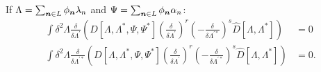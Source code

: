 \begin{lemma}
\label{lmm:formalism:func-wigner:zero-integrals}
If $\Lambda = \sum_{\boldsymbol{n} \in L} \phi_{\boldsymbol{n}} \lambda_n$ and $\Psi = \sum_{\boldsymbol{n} \in L} \phi_{\boldsymbol{n}} \alpha_n$:
\begin{equation*}
\begin{split}
	\int \delta^2\Lambda
		\frac{\delta}{\delta \Lambda^\prime} \left(
			D[\Lambda, \Lambda^*, \Psi, \Psi^*]
			\left( \frac{\delta}{\delta \Lambda^\prime} \right)^r
			\left( -\frac{\delta}{\delta \Lambda^{\prime*}} \right)^s
			\hat{D}[\Lambda, \Lambda^*]
		\right)
	& = 0 \\
	\int \delta^2\Lambda
		\frac{\delta}{\delta \Lambda^{\prime*}}
		\left(
			D[\Lambda, \Lambda^*, \Psi, \Psi^*]
			\left( \frac{\delta}{\delta \Lambda^\prime} \right)^r
			\left( -\frac{\delta}{\delta \Lambda^{\prime*}} \right)^s
			\hat{D}[\Lambda, \Lambda^*]
		\right)
	& = 0.
\end{split}
\end{equation*}
\end{lemma}

